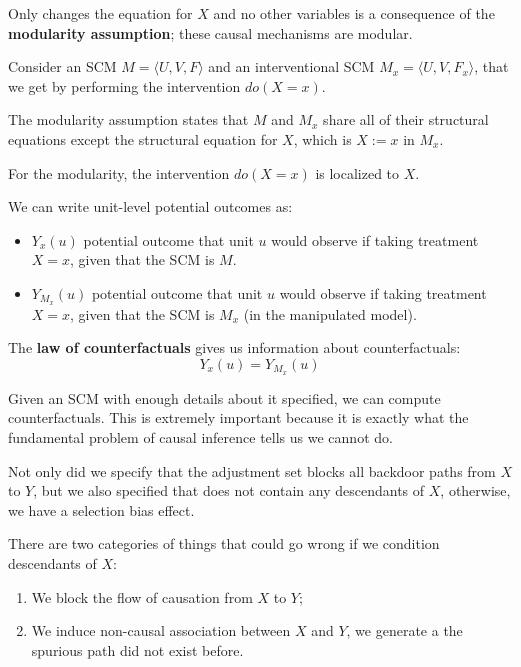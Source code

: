 Only changes the equation for $X$ and no other variables is a consequence of the
\textbf{modularity assumption}; these causal mechanisms are modular.

\begin{definition}
    Consider an SCM $M = \langle U, V, F \rangle$ and an interventional SCM
    $M_x =\langle U, V, F_x \rangle$, that we get by performing the intervention
    $do(X = x)$.

    The modularity assumption states that $M$ and $M_x$ share all of their
    structural equations except the structural equation for $X$, which is
    $X := x$ in $M_x$.
\end{definition}
For the modularity, the intervention $do(X = x)$ is localized to $X$.

We can write unit-level potential outcomes as:
\begin{itemize}
    \item $Y_x (u)$ potential outcome that unit $u$ would observe if taking treatment
          $X = x$, given that the SCM is $M$.
    \item $Y_{M_x}(u)$ potential outcome that unit $u$ would observe if taking
          treatment $X = x$, given that the SCM is $M_x$ (in the manipulated model).
\end{itemize}

The \textbf{law of counterfactuals} gives us information about counterfactuals:
\begin{equation}
    Y_x(u) = Y_{M_x}(u)
\end{equation}

Given an SCM with enough details about it specified, we can compute
counterfactuals. This is extremely important because it is exactly what the
fundamental problem of causal inference tells us we cannot do.

Not only did we specify that the adjustment set blocks all backdoor paths from
$X$ to $Y$, but we also specified that does not contain any descendants of $X$,
otherwise, we have a selection bias effect.

There are two categories of things that could go wrong if we condition descendants
of $X$:
\begin{enumerate}
    \item We block the flow of causation from $X$ to $Y$;
    \item We induce non-causal association between $X$ and $Y$, we generate a
          the spurious path did not exist before.
\end{enumerate}


